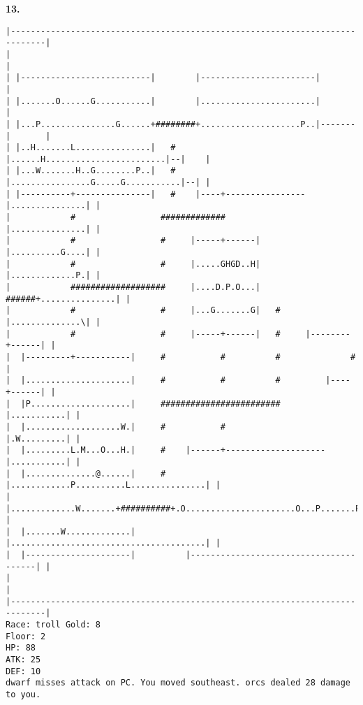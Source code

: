 \documentclass[11pt]{article}
\theoremstyle{plain}
\begin{document}
\newpage
\textbf{13. }
\begin{Verbatim}[fontsize=\scriptsize]
|-----------------------------------------------------------------------------|
|                                                                             |
| |--------------------------|        |-----------------------|               |
| |.......O......G...........|        |.......................|               |
| |...P...............G......+########+....................P..|-------|       |
| |..H.......L...............|   #    |......H........................|--|    |
| |...W.......H..G........P..|   #    |................G.....G...........|--| |
| |----------+---------------|   #    |----+----------------|...............| |
|            #                 #############                |...............| |
|            #                 #     |-----+------|         |..........G....| |
|            #                 #     |.....GHGD..H|         |.............P.| |
|            ###################     |....D.P.O...|   ######+...............| |
|            #                 #     |...G.......G|   #     |..............\| |
|            #                 #     |-----+------|   #     |--------+------| |
|  |---------+-----------|     #           #          #              #        |
|  |.....................|     #           #          #         |----+------| |
|  |P....................|     ########################         |...........| |
|  |...................W.|     #           #                    |.W.........| |
|  |.........L.M...O...H.|     #    |------+--------------------|...........| |
|  |..............@......|     #    |............P..........L...............| |
|  |.............W.......+##########+.O......................O...P.......P..| |
|  |.......W.............|          |.......................................| |
|  |---------------------|          |---------------------------------------| |
|                                                                             |
|-----------------------------------------------------------------------------|
Race: troll Gold: 8                                                    Floor: 2
HP: 88
ATK: 25
DEF: 10
dwarf misses attack on PC. You moved southeast. orcs dealed 28 damage to you. 
\end{Verbatim}
\end{document}
